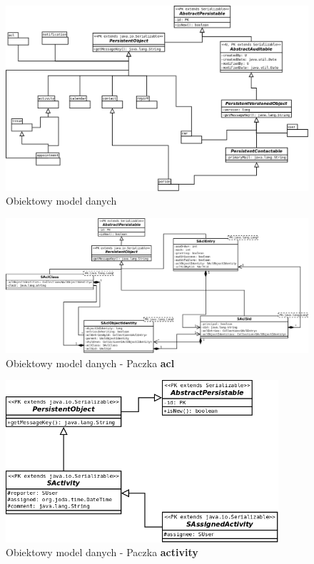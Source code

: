 	\begin{figure}[H]
		\centering
		\includegraphics[width=1.0\textwidth]{images/umls/object_model}
		\caption[Obiektowy model danych]{
			Obiektowy model danych
		}
		\label{app:schema_org_agatom_springatom_model} 
	\end{figure}
	\begin{figure}[H]
		\centering
		\includegraphics[width=1.0\textwidth]{images/umls/acl}
		\caption[Obiektowy model danych - Paczka \textbf{acl}]{
			Obiektowy model danych - Paczka \textbf{acl}
		}
		\label{app:schema_acl_package}
	\end{figure}
	\begin{figure}[H]
		\centering
		\includegraphics[width=0.9\textwidth]{images/umls/activity}
		\caption[Obiektowy model danych - Paczka \textbf{activity}]{
			Obiektowy model danych - Paczka \textbf{activity}
		}
		\label{app:schema_activity_package}
	\end{figure}

